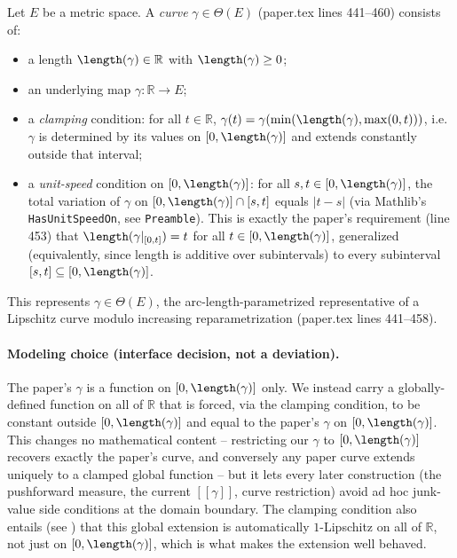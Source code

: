 \begin{definition}
  Let $E$ be a metric space. A \emph{curve} $\gamma \in \Theta(E)$ (paper.tex lines 441--460)
  consists of:
  \begin{itemize}
    \item a length $\length(\gamma) \in \mathbb{R}$ with $\length(\gamma) \ge 0$;
    \item an underlying map $\gamma \colon \mathbb{R} \to E$;
    \item a \emph{clamping} condition: for all $t \in \mathbb{R}$,
      $\gamma(t) = \gamma(\min(\length(\gamma), \max(0,t)))$, i.e.\ $\gamma$ is determined by its
      values on $[0,\length(\gamma)]$ and extends constantly outside that interval;
    \item a \emph{unit-speed} condition on $[0,\length(\gamma)]$: for all $s,t \in [0,\length(\gamma)]$,
      the total variation of $\gamma$ on $[0,\length(\gamma)] \cap [s,t]$ equals $|t-s|$ (via
      Mathlib's \texttt{HasUnitSpeedOn}, see \texttt{Preamble}). This is exactly the paper's
      requirement (line 453) that $\length(\gamma|_{[0,t]}) = t$ for all $t \in [0,\length(\gamma)]$,
      generalized (equivalently, since length is additive over subintervals) to every
      subinterval $[s,t] \subseteq [0,\length(\gamma)]$.
  \end{itemize}
  This represents $\gamma \in \Theta(E)$, the arc-length-parametrized representative of a
  Lipschitz curve modulo increasing reparametrization (paper.tex lines 441--458).

  \paragraph{Modeling choice (interface decision, not a deviation).} The paper's $\gamma$ is a
  function on $[0,\length(\gamma)]$ only. We instead carry a globally-defined function on all of
  $\mathbb{R}$ that is forced, via the clamping condition, to be constant outside
  $[0,\length(\gamma)]$ and equal to the paper's $\gamma$ on $[0,\length(\gamma)]$. This changes no
  mathematical content -- restricting our $\gamma$ to $[0,\length(\gamma)]$ recovers exactly the
  paper's curve, and conversely any paper curve extends uniquely to a clamped global function --
  but it lets every later construction (the pushforward measure, the current $[[\gamma]]$, curve
  restriction) avoid ad hoc junk-value side conditions at the domain boundary. The clamping
  condition also entails (see ) that this global extension is
  automatically $1$-Lipschitz on all of $\mathbb{R}$, not just on $[0,\length(\gamma)]$, which is
  what makes the extension well behaved.
\end{definition}
